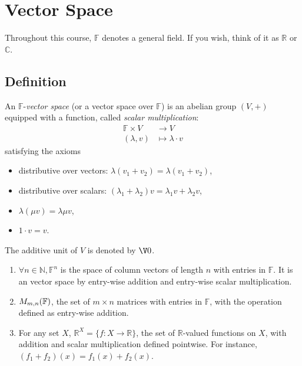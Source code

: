 \documentclass[a4paper]{article}
\newcommand*{\M}{\matrixring}
\theoremstyle{definition}
\begin{document}


\tableofcontents

\section{Vector Space}

\begin{convention}
  Throughout this course, $\mathbb{F}$ denotes a general field. If you wish, think of it as $\mathbb{R}$ or $\mathbb{C}$.
\end{convention}

\subsection{Definition}

\begin{definition}
  An $\mathbb{F}$-\emph{vector space} (or a vector space over $\mathbb{F}$) is an abelian group $(V, +)$ equipped with a function, called \emph{scalar multiplication}:
  \begin{align*}
    \mathbb{F}\times V &\to V \\
    (\lambda, v) &\mapsto \lambda\cdot v
  \end{align*}
  satisfying the axioms
  \begin{itemize}
  \item distributive over vectors: $\lambda(v_1+v_2) = \lambda(v_1+v_2)$,
  \item distributive over scalars: $(\lambda_1+\lambda_2)v= \lambda_1 v+\lambda_2 v$,
  \item $\lambda(\mu v) = \lambda \mu v$,
  \item $1\cdot v = v$.
  \end{itemize}
\end{definition}

The additive unit of $V$ is denoted by $\V 0$.

\begin{eg}\leavevmode
  \label{eg:matrix as V}
  \begin{enumerate}
  \item $\forall n \in \mathbb{N}, \mathbb{F}^n$ is the space of column vectors of length $n$ with entries in $\mathbb{F}$. It is an vector space by entry-wise addition and entry-wise scalar multiplication.
  \item $\\M_{m,n}(\mathbb{F})$, the set of $m\times n$ matrices with entries in $\mathbb{F}$, with the operation defined as entry-wise addition.
    \item For any set $X$, $\mathbb{R}^X = \{f: X \to \mathbb{R}\}$, the set of $\mathbb{R}$-valued functions on $X$, with addition and scalar multiplication defined pointwise. For instance, $(f_1+f_2)(x) = f_1(x)+f_2(x)$.
  \end{enumerate}
\end{eg}
\end{document}

